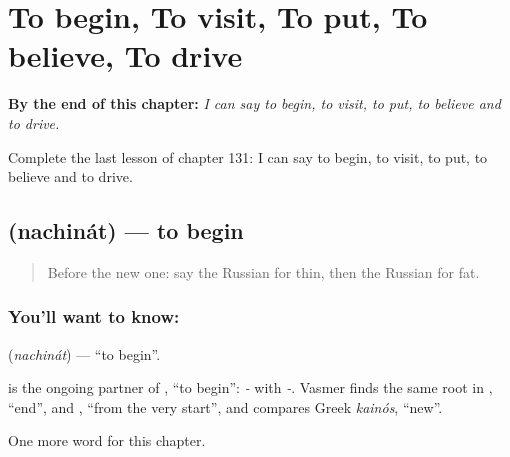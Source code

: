 
\chapter{To begin, To visit, To put, To believe, To drive}
\label{ch:ru-to-begin-to-visit-to-put-to-believe-to-drive}

\begin{chapteropening}
\textbf{By the end of this chapter:} \emph{I can say to begin, to visit, to put, to believe and to drive.}

Complete the last lesson of chapter 131: I can say to begin, to visit, to put, to believe and to drive.
\end{chapteropening}

\section[\texorpdfstring{\ru{начинать} (nachinát)}{начинать (nachinát)}]{ (nachinát) — to begin}

\label{lesson:RU-C131-to-begin}



\begin{quote}
Before the new one: say the Russian for thin, then the Russian for fat.
\end{quote}

\subsection*{You'll want to know: }
\textbf{} (\emph{nachinát}) — \textquotedblleft{}to begin\textquotedblright{}.

\begin{cousinweb}
\textbf{} is the ongoing partner of \emph{}, \textquotedblleft{}to begin\textquotedblright{}: \emph{-} with \emph{-}. Vasmer finds the same root in \emph{}, \textquotedblleft{}end\textquotedblright{}, and \emph{}, \textquotedblleft{}from the very start\textquotedblright{}, and compares Greek \emph{kainós}, \textquotedblleft{}new\textquotedblright{}.
\end{cousinweb}

\begin{grammarlens}[title={What you've built}]
One more word for this chapter.
\end{grammarlens}

